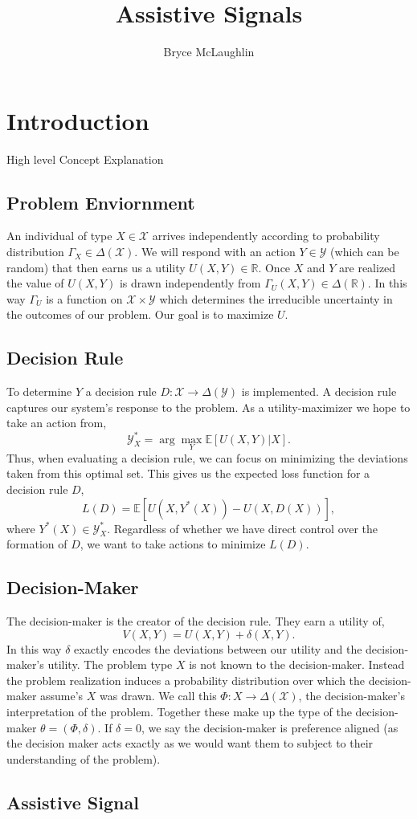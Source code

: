 \documentclass[10pt]{article}
\title{Assistive Signals}
\author{Bryce McLaughlin}
\newcommand{\R}{\mathbb{R}}
\newcommand{\X}{\mathcal{X}}
\newcommand{\Y}{\mathcal{Y}}
\newcommand{\E}{\mathbb{E}}
\begin{document}
\section*{Introduction}

High level Concept Explanation

\subsection*{Problem Enviornment}

An individual of type $X \in \X$ arrives independently according to probability distribution $\Gamma_X \in \Delta(\X)$. We will respond with an action $Y \in \Y$ (which can be random) that then earns us a utility $U(X,Y) \in \R$. Once $X$ and $Y$ are realized the value of $U(X,Y)$ is drawn independently from $\Gamma_U(X,Y) \in \Delta(\mathbb{R}).$ In this way $\Gamma_U$ is a function on $\X \times \Y$ which determines the irreducible uncertainty in the outcomes of our problem. Our goal is to maximize $U$.

\subsection*{Decision Rule}

To determine $Y$ a decision rule $D:\X \to \Delta(\Y)$ is implemented. A decision rule captures our system's response to the problem. As a utility-maximizer we hope to take an action from,
$$\Y^*_X = \arg\max_Y \E[U(X,Y)|X].$$
Thus, when evaluating a decision rule, we can focus on minimizing the deviations taken from this optimal set. This gives us the expected loss function for a decision rule $D$,
$$L(D) = \E[U(X,Y^*(X)) - U(X,D(X))],$$
where $Y^*(X) \in \Y^*_X$. Regardless of whether we have direct control over the formation of $D$, we want to take actions to minimize $L(D).$

\subsection*{Decision-Maker}

The decision-maker is the creator of the decision rule. They earn a utility of,
$$V(X,Y) = U(X,Y) + \delta(X,Y).$$
In this way $\delta$ exactly encodes the deviations between our utility and the decision-maker's utility. The problem type $X$ is not known to the decision-maker. Instead the problem realization induces a probability distribution over which the decision-maker assume's $X$ was drawn. We call this $\Phi:X \to \Delta(\X)$, the decision-maker's interpretation of the problem. Together these make up the type of the decision-maker $\theta = (\Phi,\delta).$ If $\delta = 0$, we say the decision-maker is preference aligned (as the decision maker acts exactly as we would want them to subject to their understanding of the problem).





\subsection*{Assistive Signal}
\end{document}

